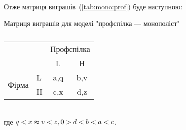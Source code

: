 Отже матриця виграшів~(\ref{tab:mono:prof}) буде наступною:
\begin{table}[h]
	
	\centering
	\caption{}
	Матриця виграшів для моделі "профспілка --- монополіст"\\
		\normalsize

\begin{tabular}{|l|l|c|c|}
	\hline
	\multicolumn{2}{|l|}{\multirow{2}{*}{}} & \multicolumn{2}{l|}{Профспілка} \\ \cline{3-4} 
	\multicolumn{2}{|l|}{}                  & L                & H                \\ \hline
	\multirow{2}{*}{Фiрма}    & L   & a,q              & b,v              \\ \cline{2-4} 
	& H   & c,x              & d,z              \\ \hline
\end{tabular}
	\label{table:firm}
\end{table}\\
где $q < x \thickapprox v < z, 0 > d < b < a < c$.
